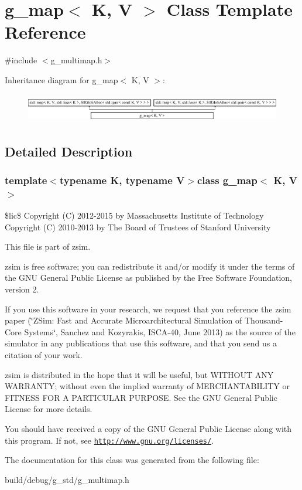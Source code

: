 \hypertarget{classg__map}{\section{g\-\_\-map$<$ K, V $>$ Class Template Reference}
\label{classg__map}
}


{\ttfamily \#include $<$g\-\_\-multimap.\-h$>$}

Inheritance diagram for g\-\_\-map$<$ K, V $>$\-:\begin{figure}[H]
\begin{center}
\leavevmode
\includegraphics[height=1.299304cm]{classg__map}
\end{center}
\end{figure}


\subsection{Detailed Description}
\subsubsection*{template$<$typename K, typename V$>$class g\-\_\-map$<$ K, V $>$}

\$lic\$ Copyright (C) 2012-\/2015 by Massachusetts Institute of Technology Copyright (C) 2010-\/2013 by The Board of Trustees of Stanford University

This file is part of zsim.

zsim is free software; you can redistribute it and/or modify it under the terms of the G\-N\-U General Public License as published by the Free Software Foundation, version 2.

If you use this software in your research, we request that you reference the zsim paper (\char`\"{}\-Z\-Sim\-: Fast and Accurate Microarchitectural Simulation of
\-Thousand-\/\-Core Systems\char`\"{}, Sanchez and Kozyrakis, I\-S\-C\-A-\/40, June 2013) as the source of the simulator in any publications that use this software, and that you send us a citation of your work.

zsim is distributed in the hope that it will be useful, but W\-I\-T\-H\-O\-U\-T A\-N\-Y W\-A\-R\-R\-A\-N\-T\-Y; without even the implied warranty of M\-E\-R\-C\-H\-A\-N\-T\-A\-B\-I\-L\-I\-T\-Y or F\-I\-T\-N\-E\-S\-S F\-O\-R A P\-A\-R\-T\-I\-C\-U\-L\-A\-R P\-U\-R\-P\-O\-S\-E. See the G\-N\-U General Public License for more details.

You should have received a copy of the G\-N\-U General Public License along with this program. If not, see \href{http://www.gnu.org/licenses/}{\tt http\-://www.\-gnu.\-org/licenses/}. 

The documentation for this class was generated from the following file\-:\begin{DoxyCompactItemize}
\item 
build/debug/g\-\_\-std/g\-\_\-multimap.\-h\end{DoxyCompactItemize}
